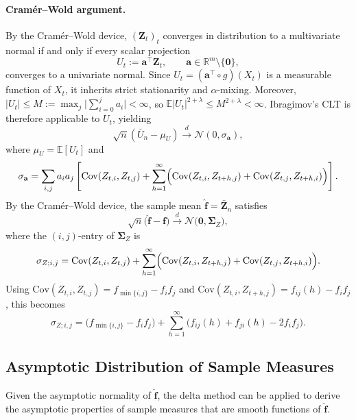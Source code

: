 \documentclass[12pt,a4paper]{scrreprt}
\begin{document}
\paragraph{Cramér–Wold argument.}
By the Cramér–Wold device, $(\mathbf{Z}_t)_t$ converges in distribution to a multivariate
normal if and only if every scalar projection
\[
    U_t := \mathbf{a}^{\top}\mathbf{Z}_t, \qquad \mathbf{a} \in \mathbb{R}^{m} \setminus \{\mathbf{0}\},
\]
converges to a univariate normal. Since $U_t = (\mathbf{a}^{\top} \circ g)(X_t)$ is a
measurable function of $X_t$, it inherits strict stationarity and $\alpha$-mixing. Moreover,
$|U_t| \leq M := \max_{j}\bigl|\sum_{i=0}^{j}a_i\bigr| < \infty$, so
$\mathbb{E}|U_t|^{2+\lambda} \leq M^{2+\lambda} < \infty$. Ibragimov's CLT is therefore
applicable to $U_t$, yielding
\[
    \sqrt{n}(\bar{U}_n - \mu_{U}) \xrightarrow{d} \mathcal{N}(0, \sigma_{\mathbf{a}}),
\]
where $\mu_U = \mathbb{E}[U_t]$ and
\[
    \sigma_{\mathbf{a}} = \sum_{i,j} a_i a_j \left[
        \mathrm{Cov}(Z_{t,i}, Z_{t,j})
        + \sum_{h=1}^{\infty}
        \Bigl(\mathrm{Cov}(Z_{t,i}, Z_{t+h,j}) + \mathrm{Cov}(Z_{t,j}, Z_{t+h,i})\Bigr)
    \right].
\]
By the Cramér–Wold device, the sample mean $\hat{\mathbf{f}} = \bar{\mathbf{Z}}_n$ satisfies
\[
    \sqrt{n}\bigl(\hat{\mathbf{f}} - \mathbf{f}\bigr)
    \xrightarrow{d} \mathcal{N}\bigl(\mathbf{0}, \boldsymbol{\Sigma}_Z\bigr),
\]
where the $(i,j)$-entry of $\boldsymbol{\Sigma}_Z$ is
\[
    \sigma_{Z;i,j}
    = \mathrm{Cov}(Z_{t,i}, Z_{t,j})
    + \sum_{h=1}^{\infty}
    \Bigl(\mathrm{Cov}(Z_{t,i}, Z_{t+h,j}) + \mathrm{Cov}(Z_{t,j}, Z_{t+h,i})\Bigr).
\]
Using $\mathrm{Cov}(Z_{t,i}, Z_{t,j}) = f_{\min\{i,j\}} - f_i f_j$ and
$\mathrm{Cov}(Z_{t,i}, Z_{t+h,j}) = f_{ij}(h) - f_i f_j$, this becomes
\[
    \sigma_{Z;i,j}
    = \bigl(f_{\min\{i,j\}} - f_i f_j\bigr)
    + \sum_{h=1}^{\infty} \bigl(f_{ij}(h) + f_{ji}(h) - 2f_i f_j\bigr).
\]

\subsection{Asymptotic Distribution of Sample Measures}

Given the asymptotic normality of $\hat{\mathbf{f}}$, the delta method can be applied to
derive the asymptotic properties of sample measures that are smooth functions of $\hat{\mathbf{f}}$.
\end{document}
